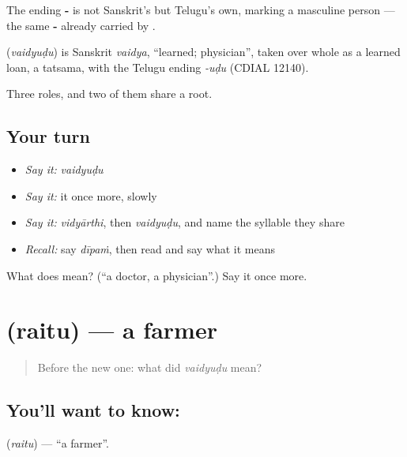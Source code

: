 The ending \textbf{-} is not Sanskrit's but Telugu's own, marking a masculine person — the same \textbf{-} already carried by .

\begin{cousinweb}
\textbf{} (\emph{vaidyuḍu}) is Sanskrit \emph{vaidya}, \textquotedblleft{}learned; physician\textquotedblright{}, taken over whole as a learned loan, a tatsama, with the Telugu ending \emph{-uḍu} (CDIAL 12140).
\end{cousinweb}

\begin{grammarlens}[title={What you've built}]
Three roles, and two of them share a root.
\end{grammarlens}

\subsection*{Your turn}
\begin{itemize}
\raggedright
  \item \emph{Say it:} \emph{vaidyuḍu}
  \item \emph{Say it:} it once more, slowly
  \item \emph{Say it:} \emph{vidyārthi}, then \emph{vaidyuḍu}, and name the syllable they share
  \item \emph{Recall:} say \emph{dīpaṁ}, then read \textbf{} and say what it means
\end{itemize}

\begin{tcolorbox}[breakable,colback=teal!4,colframe=teal!35!black,title={Before you move on}]
What does  mean? (\textquotedblleft{}a doctor, a physician\textquotedblright{}.) Say it once more.
\end{tcolorbox}
\section[\texorpdfstring{\te{రైతు} (raitu)}{రైతు (raitu)}]{ (raitu) — a farmer}

\label{lesson:TE-C48-farmer}



\begin{quote}
Before the new one: what did \emph{vaidyuḍu} mean?
\end{quote}

\subsection*{You'll want to know: }
\textbf{} (\emph{raitu}) — \textquotedblleft{}a farmer\textquotedblright{}.

